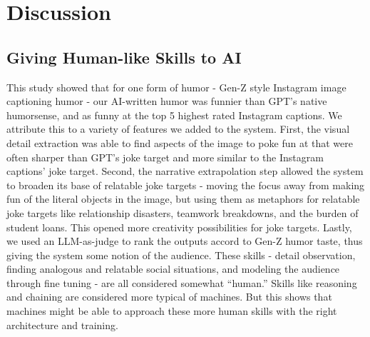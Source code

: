 

\section{Discussion}
\subsection{Giving Human-like Skills to AI} 
This study showed that for one form of humor - Gen-Z style Instagram image captioning humor - our AI-written humor was funnier than GPT's native humorsense, and as funny at the top 5 highest rated Instagram captions. We attribute this to a variety of features we added to the system. First, the visual detail extraction was able to find aspects of the image to poke fun at that were often sharper than GPT's joke target and more similar to the Instagram captions' joke target. Second, the narrative extrapolation step allowed the system to broaden its base of relatable joke targets - moving the focus away from making fun of the literal objects in the image, but using them as metaphors for relatable joke targets like relationship disasters, teamwork breakdowns, and the burden of student loans. This opened more creativity possibilities for joke targets. Lastly, we used an LLM-as-judge to rank the outputs accord to Gen-Z humor taste, thus giving the system some notion of the audience. These skills - detail observation, finding analogous and relatable social situations, and modeling the audience through fine tuning - are all considered somewhat ``human.'' Skills like reasoning and chaining are considered more typical of machines. But this shows that machines might be able to approach these more human skills with the right architecture and training.  



